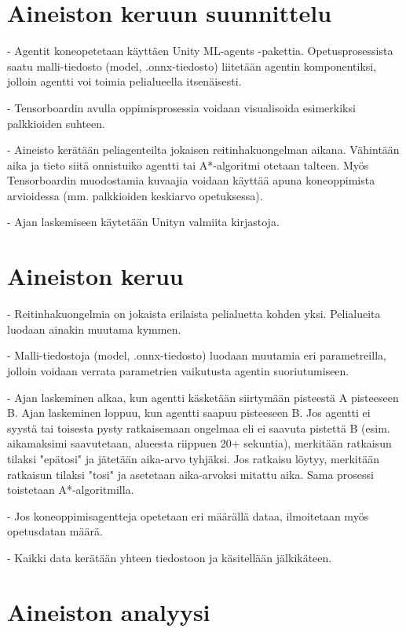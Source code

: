 \documentclass[utf8]{gradu3}
\begin{document}
\chapter{Aineiston keruun suunnittelu}

- Agentit koneopetetaan käyttäen Unity ML-agents -pakettia. Opetusprosessista saatu malli-tiedosto (model, .onnx-tiedosto) liitetään agentin
komponentiksi, jolloin agentti voi toimia pelialueella itsenäisesti.

- Tensorboardin avulla oppimisprosessia voidaan visualisoida esimerkiksi palkkioiden suhteen.

- Aineisto kerätään peliagenteilta jokaisen reitinhakuongelman aikana. Vähintään aika ja tieto siitä onnistuiko agentti tai A*-algoritmi otetaan talteen.
Myös Tensorboardin muodostamia kuvaajia voidaan käyttää apuna koneoppimista arvioidessa (mm. palkkioiden keskiarvo opetuksessa).

- Ajan laskemiseen käytetään Unityn valmiita kirjastoja.

\chapter{Aineiston keruu}

- Reitinhakuongelmia on jokaista erilaista pelialuetta kohden yksi. Pelialueita luodaan ainakin muutama kymmen.

- Malli-tiedostoja (model, .onnx-tiedosto) luodaan muutamia eri parametreilla, jolloin voidaan verrata parametrien vaikutusta agentin suoriutumiseen.

- Ajan laskeminen alkaa, kun agentti käsketään siirtymään pisteestä A pisteeseen B.
Ajan laskeminen loppuu, kun agentti saapuu pisteeseen B. Jos agentti ei syystä tai toisesta
pysty ratkaisemaan ongelmaa eli ei saavuta pistettä B (esim. aikamaksimi saavutetaan, alueesta riippuen 20+ sekuntia), merkitään ratkaisun tilaksi "epätosi"
ja jätetään aika-arvo tyhjäksi. Jos ratkaisu löytyy, merkitään ratkaisun tilaksi "tosi" ja
asetetaan aika-arvoksi mitattu aika. Sama prosessi toistetaan A*-algoritmilla.

- Jos koneoppimisagentteja opetetaan eri määrällä dataa, ilmoitetaan myös opetusdatan määrä.

- Kaikki data kerätään yhteen tiedostoon ja käsitellään jälkikäteen.

\chapter{Aineiston analyysi}
\end{document}
